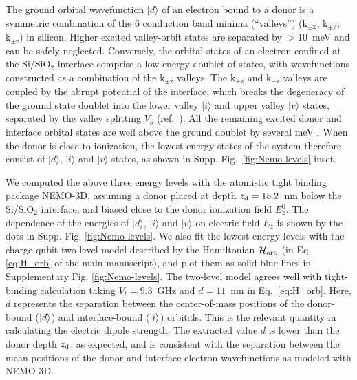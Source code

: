 \documentclass[aps,prb,superscriptaddress,nobibnotes,twocolumn]{revtex4-1}
\begin{document}
The ground orbital wavefunction $\lvert d \rangle$ of an electron bound to a donor is a symmetric combination of the 6 conduction band minima (``valleys'') ($\mathrm{k_{\pm x}}$, $\mathrm{k_{\pm y}} $, $\mathrm{k_{\pm z}} $) in silicon\cite{Kohn1955S}. Higher excited valley-orbit states are separated by $>10$~meV and can be safely neglected. Conversely, the orbital states of an electron confined at the Si/SiO$_2$ interface comprise a low-energy doublet of states, with wavefunctions constructed as a combination of the $\mathrm{k_{\pm z}}$ valleys. The $\mathrm{k_{+z}}$ and $\mathrm{k_{-z}}$ valleys are coupled by the abrupt potential of the interface, which breaks the degeneracy of the ground state doublet into the lower valley $\lvert i \rangle$ and upper valley $\lvert v \rangle$ states, separated by the valley splitting $V_s$ (ref.~). All the remaining excited donor and interface orbital states are well above the ground doublet by several meV \cite{Rahman2009S, Calderon2009S}. When the donor is close to ionization, the lowest-energy states of the system therefore consist of $\lvert d \rangle$, $\lvert i \rangle$ and $\lvert v\rangle$ states, as shown in Supp. Fig.~\ref{fig:Nemo-levels} inset.

We computed the above three energy levels with the atomistic tight binding package NEMO-3D\cite{Klimeck2007S, Klimeck2007aS}, assuming a donor placed at depth $z_{\rm d} = 15.2$~nm below the Si/SiO$_2$ interface, and biased close to the donor ionization field $E_z^0$. The dependence of the energies of $\lvert d \rangle$, $\lvert i \rangle$ and $\lvert v\rangle$ on electric field $E_z$ is shown by the dots in Supp. Fig. \ref{fig:Nemo-levels}. We also fit the lowest energy levels with the charge qubit two-level model described by the Hamiltonian $\mathcal{H}_{\rm orb}$ (in Eq. \ref{eq:H_orb} of the main manuscript), and plot them as solid blue lines in Supplementary Fig. \ref{fig:Nemo-levels}. The two-level model agrees well with tight-binding calculation taking $V_t = 9.3$~GHz and $d = 11$~nm in Eq.~\ref{eq:H_orb}. Here, $d$ represents the separation between the center-of-mass positions of the donor-bound ($\ket{d}$) and interface-bound ($\ket{i}$) orbitals. This is the relevant quantity in calculating the electric dipole strength. The extracted value $d$ is lower than the donor depth $z_{\rm d}$, as expected, and is consistent with the separation between the mean positions of the donor and interface electron wavefunctions as modeled with NEMO-3D.
\end{document}
